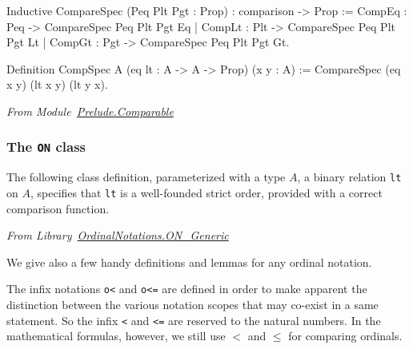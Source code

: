 \begin{Coqsrc}
  Inductive CompareSpec (Peq Plt Pgt : Prop) :
  comparison -> Prop :=
    CompEq : Peq -> CompareSpec Peq Plt Pgt Eq
  | CompLt : Plt -> CompareSpec Peq Plt Pgt Lt
  | CompGt : Pgt -> CompareSpec Peq Plt Pgt Gt.

Definition CompSpec {A} (eq lt : A -> A -> Prop) (x y : A) :=
 CompareSpec (eq x y) (lt x y) (lt y x).
\end{Coqsrc}

\emph{From Module~\href{../theories/html/hydras.Prelude/mparable.html\#Hvariant}{Prelude.Comparable}}

\label{sect:comparable-def}







\subsubsection{The \texttt{ON} class}

The following class definition, parameterized with a type $A$, a binary relation \texttt{lt} on $A$, specifies that \texttt{lt} is a well-founded strict order, provided with a correct comparison function.


\vspace{4pt}
\noindent\emph{From
Library~\href{../theories/html/hydras.OrdinalNotations.ON_Generic.html}{OrdinalNotations.ON\_Generic}}

\label{types:ON}




We give  also a few handy definitions and lemmas for any ordinal notation.

\label{sect:on-lt-notation}
\label{sect:on-le-notation}
\label{sect:measure-ON}
\label{sect:bigO-ON}



\begin{remark}
The infix notations \texttt{o<} and \texttt{o<=} are defined in order to make apparent the distinction between the various notation scopes that may co-exist in a same statement. So the infix \texttt{<} and \texttt{<=} are reserved to the natural numbers. In the mathematical formulas, however, we still use $<$ and $\leq$ for comparing ordinals.
\end{remark}



